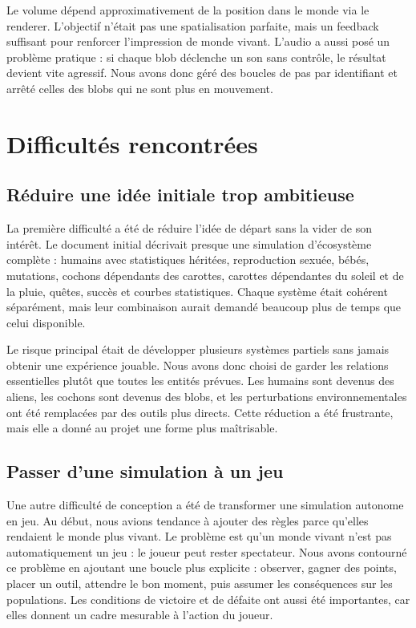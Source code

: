 ﻿\documentclass[11pt,a4paper]{article}
\begin{document}
Le volume dépend approximativement de la position dans le monde via le renderer. L'objectif n'était pas une spatialisation parfaite, mais un feedback suffisant pour renforcer l'impression de monde vivant. L'audio a aussi posé un problème pratique : si chaque blob déclenche un son sans contrôle, le résultat devient vite agressif. Nous avons donc géré des boucles de pas par identifiant et arrêté celles des blobs qui ne sont plus en mouvement.

\section{Difficultés rencontrées}

\subsection{Réduire une idée initiale trop ambitieuse}

La première difficulté a été de réduire l'idée de départ sans la vider de son intérêt. Le document initial décrivait presque une simulation d'écosystème complète : humains avec statistiques héritées, reproduction sexuée, bébés, mutations, cochons dépendants des carottes, carottes dépendantes du soleil et de la pluie, quêtes, succès et courbes statistiques. Chaque système était cohérent séparément, mais leur combinaison aurait demandé beaucoup plus de temps que celui disponible.

Le risque principal était de développer plusieurs systèmes partiels sans jamais obtenir une expérience jouable. Nous avons donc choisi de garder les relations essentielles plutôt que toutes les entités prévues. Les humains sont devenus des aliens, les cochons sont devenus des blobs, et les perturbations environnementales ont été remplacées par des outils plus directs. Cette réduction a été frustrante, mais elle a donné au projet une forme plus maîtrisable.

\subsection{Passer d'une simulation à un jeu}

Une autre difficulté de conception a été de transformer une simulation autonome en jeu. Au début, nous avions tendance à ajouter des règles parce qu'elles rendaient le monde plus vivant. Le problème est qu'un monde vivant n'est pas automatiquement un jeu : le joueur peut rester spectateur. Nous avons contourné ce problème en ajoutant une boucle plus explicite : observer, gagner des points, placer un outil, attendre le bon moment, puis assumer les conséquences sur les populations. Les conditions de victoire et de défaite ont aussi été importantes, car elles donnent un cadre mesurable à l'action du joueur.
\end{document}
